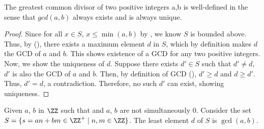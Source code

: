 \begin{theorem}  
 The greatest common divisor of two positive integers a,b is well-defined in the sense that $gcd(a,b)$ always exists and is always unique. 
\end{theorem}

\begin{proof}
\noindent Since for all $x \in S$, $x\leq \min{(a,b)} $  by , we know $S$ is bounded above. Thus, by (), there exists a maximum element $d$ in $S$, which by definition makes $d$ the GCD of $a$ and $b$. This shows existence of a GCD for any two positive integers. \\

Now, we show the uniqueness of $d$. Suppose there exists $d' \in S$ such that $d'\neq d$, $d'$ is also the GCD of $a$ and $b$. Then, by definition of GCD (), $d' \geq d$ and $d\geq d'$. Thus, $d'=d$, a contradiction. Therefore, no such $d'$ can exist, showing uniqueness.
\end{proof}


\begin{theorem}  \label{Bezout}
    Given $a$, $b$ in $\ZZ$ such that and $a$, $b$ are not simultaneously 0. Consider the set $S=\{ s=an+bm \in \ZZ^+ \mid n, m \in \ZZ\}$. The least element $d$ of $S$ is $\gcd(a, b)$.
\end{theorem}

